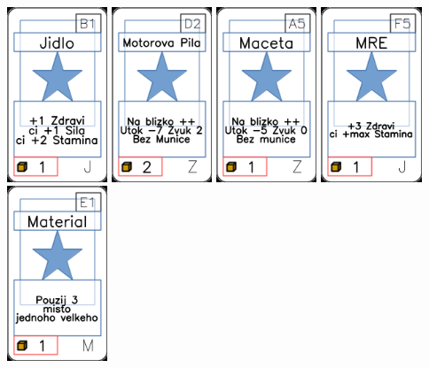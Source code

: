 \documentclass[a4paper]{article}
\begin{document}
	\includegraphics[width=3.0cm]{img-1_5}
	\includegraphics[width=3.0cm]{img-1_106}
	\includegraphics[width=3.0cm]{img-1_94}
	\includegraphics[width=3.0cm]{img-1_29}
	\includegraphics[width=3.0cm]{img-1_50}
\end{document}
